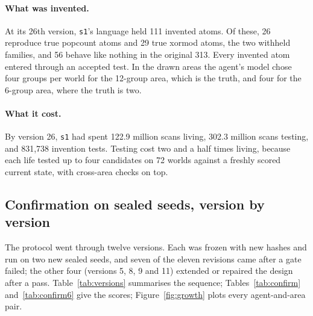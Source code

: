 \documentclass[11pt]{article}
\begin{document}
\paragraph{What was invented.} At its 26th version, \texttt{s1}'s language held 111 invented atoms. Of these, 26 reproduce true popcount atoms and 29 true xormod atoms, the two withheld families, and 56 behave like nothing in the original 313. Every invented atom entered through an accepted test. In the drawn areas the agent's model chose four groups per world for the 12-group area, which is the truth, and four for the 6-group area, where the truth is two.

\paragraph{What it cost.} By version 26, \texttt{s1} had spent 122.9 million scans living, 302.3 million scans testing, and 831,738 invention tests. Testing cost two and a half times living, because each life tested up to four candidates on 72 worlds against a freshly scored current state, with cross-area checks on top.

\subsection{Confirmation on sealed seeds, version by version}

The protocol went through twelve versions. Each was frozen with new hashes and run on two new sealed seeds, and seven of the eleven revisions came after a gate failed; the other four (versions 5, 8, 9 and 11) extended or repaired the design after a pass. Table~\ref{tab:versions} summarises the sequence; Tables~\ref{tab:confirm} and~\ref{tab:confirm6} give the scores; Figure~\ref{fig:growth} plots every agent-and-area pair.
\end{document}
